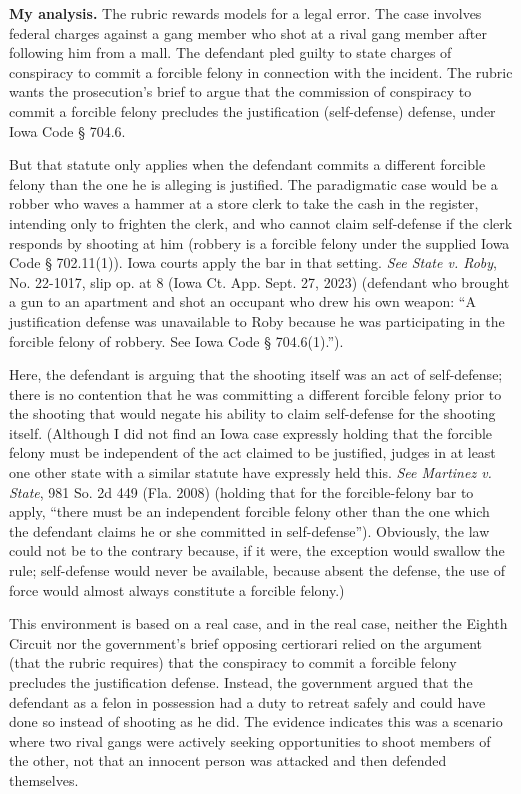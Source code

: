 \documentclass[11pt]{article}
\begin{document}
\noindent\textbf{My analysis.} The rubric rewards models for a legal error. The case involves federal charges against a gang member who shot at a rival gang member after following him from a mall. The defendant pled guilty to state charges of conspiracy to commit a forcible felony in connection with the incident. The rubric wants the prosecution's brief to argue that the commission of conspiracy to commit a forcible felony precludes the justification (self-defense) defense, under Iowa Code § 704.6.

But that statute only applies when the defendant commits a different forcible felony than the one he is alleging is justified. The paradigmatic case would be a robber who waves a hammer at a store clerk to take the cash in the register, intending only to frighten the clerk, and who cannot claim self-defense if the clerk responds by shooting at him (robbery is a forcible felony under the supplied Iowa Code § 702.11(1)). Iowa courts apply the bar in that setting. \emph{See State v. Roby}, No. 22-1017, slip op. at 8 (Iowa Ct. App. Sept. 27, 2023) (defendant who brought a gun to an apartment and shot an occupant who drew his own weapon: “A justification defense was unavailable to Roby because he was participating in the forcible felony of robbery. See Iowa Code § 704.6(1).”).

Here, the defendant is arguing that the shooting itself was an act of self-defense; there is no contention that he was committing a different forcible felony prior to the shooting that would negate his ability to claim self-defense for the shooting itself. (Although I did not find an Iowa case expressly holding that the forcible felony must be independent of the act claimed to be justified, judges in at least one other state with a similar statute have expressly held this. \emph{See Martinez v. State}, 981 So. 2d 449 (Fla. 2008) (holding that for the forcible-felony bar to apply, ``there must be an independent forcible felony other than the one which the defendant claims he or she committed in self-defense''). Obviously, the law could not be to the contrary because, if it were, the exception would swallow the rule; self-defense would never be available, because absent the defense, the use of force would almost always constitute a forcible felony.)

This environment is based on a real case, and in the real case, neither the Eighth Circuit nor the government's brief opposing certiorari relied on the argument (that the rubric requires) that the conspiracy to commit a forcible felony precludes the justification defense. Instead, the government argued that the defendant as a felon in possession had a duty to retreat safely and could have done so instead of shooting as he did. The evidence indicates this was a scenario where two rival gangs were actively seeking opportunities to shoot members of the other, not that an innocent person was attacked and then defended themselves.
\end{document}

